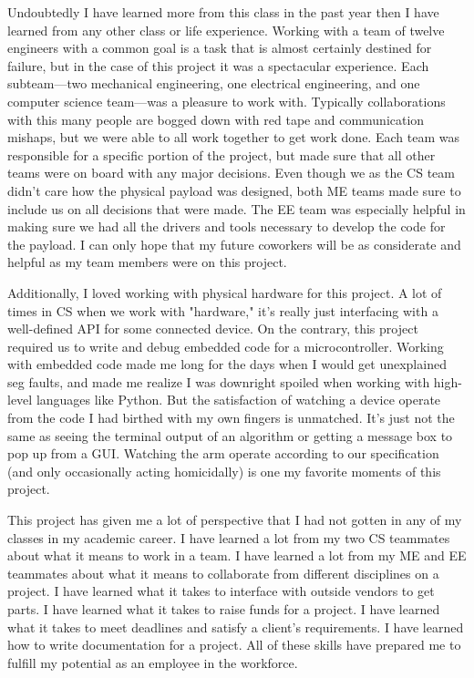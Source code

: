 Undoubtedly I have learned more from this class in the past year then I have learned from any other class or life experience. Working with a team of twelve engineers with a common goal is a task that is almost certainly destined for failure, but in the case of this project it was a spectacular experience. Each subteam—two mechanical engineering, one electrical engineering, and one computer science team—was a pleasure to work with. Typically collaborations with this many people are bogged down with red tape and communication mishaps, but we were able to all work together to get work done. Each team was responsible for a specific portion of the project, but made sure that all other teams were on board with any major decisions. Even though we as the CS team didn't care how the physical payload was designed, both ME teams made sure to include us on all decisions that were made. The EE team was especially helpful in making sure we had all the drivers and tools necessary to develop the code for the payload. I can only hope that my future coworkers will be as considerate and helpful as my team members were on this project.

Additionally, I loved working with physical hardware for this project. A lot of times in CS when we work with "hardware," it's really just interfacing with a well-defined API for some connected device. On the contrary, this project required us to write and debug embedded code for a microcontroller. Working with embedded code made me long for the days when I would get unexplained seg faults, and made me realize I was downright spoiled when working with high-level languages like Python. But the satisfaction of watching a device operate from the code I had birthed with my own fingers is unmatched. It's just not the same as seeing the terminal output of an algorithm or getting a message box to pop up from a GUI. Watching the arm operate according to our specification (and only occasionally acting homicidally) is one my favorite moments of this project.

This project has given me a lot of perspective that I had not gotten in any of my classes in my academic career. I have learned a lot from my two CS teammates about what it means to work in a team. I have learned a lot from my ME and EE teammates about what it means to collaborate from different disciplines on a project. I have learned what it takes to interface with outside vendors to get parts. I have learned what it takes to raise funds for a project. I have learned what it takes to meet deadlines and satisfy a client's requirements. I have learned how to write documentation for a project. All of these skills have prepared me to fulfill my potential as an employee in the workforce.

